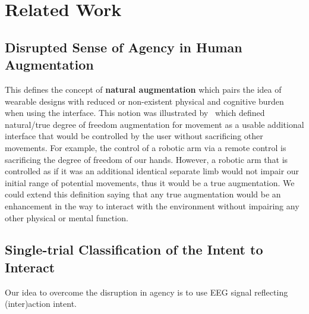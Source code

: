 \section{Related Work}

\subsection{Disrupted Sense of Agency in Human Augmentation}

This defines the concept of \textbf{natural augmentation} which pairs the idea of wearable designs with reduced or non-existent physical and cognitive burden when using the interface. This notion was illustrated by~\citet{Eden2021-og} which defined natural/true degree of freedom augmentation for movement as a usable additional interface that would be controlled by the user without sacrificing other movements. For example, the control of a robotic arm via a remote control is sacrificing the degree of freedom of our hands. However, a robotic arm that is controlled as if it was an additional identical separate limb would not impair our initial range of potential movements, thus it would be a true augmentation. We could extend this definition saying that any true augmentation would be an enhancement in the way to interact with the environment without impairing any other physical or mental function.

\subsection{Single-trial Classification of the Intent to Interact}

Our idea to overcome the disruption in agency is to use EEG signal reflecting (inter)action intent.

